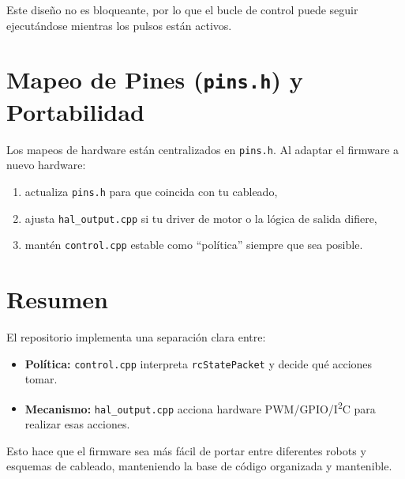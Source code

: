 Este diseño no es bloqueante, por lo que el bucle de control puede seguir ejecutándose mientras los pulsos están activos.

\section{Mapeo de Pines (\texttt{pins.h}) y Portabilidad}
\label{sec:control-hal-pins}

Los mapeos de hardware están centralizados en \texttt{pins.h}. Al adaptar el firmware a nuevo hardware:

\begin{enumerate}
    \item actualiza \texttt{pins.h} para que coincida con tu cableado,
    \item ajusta \texttt{hal\_output.cpp} si tu driver de motor o la lógica de salida difiere,
    \item mantén \texttt{control.cpp} estable como ``política'' siempre que sea posible.
\end{enumerate}

\section{Resumen}
\label{sec:control-hal-summary}

El repositorio implementa una separación clara entre:

\begin{itemize}
    \item \textbf{Política:} \texttt{control.cpp} interpreta \texttt{rcStatePacket} y decide qué acciones tomar.
    \item \textbf{Mecanismo:} \texttt{hal\_output.cpp} acciona hardware PWM/GPIO/I\textsuperscript{2}C para realizar esas acciones.
\end{itemize}

Esto hace que el firmware sea más fácil de portar entre diferentes robots y esquemas de cableado, manteniendo la base de código
organizada y mantenible.